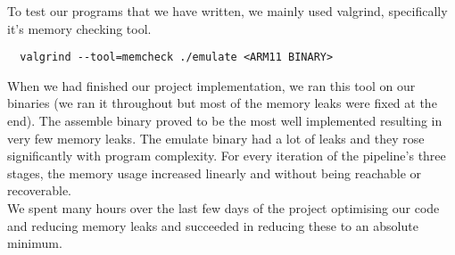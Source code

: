 To test our programs that we have written, we mainly used valgrind, specifically it's memory checking tool.

\begin{verbatim}
  valgrind --tool=memcheck ./emulate <ARM11 BINARY>
\end{verbatim}

When we had finished our project implementation, we ran this tool on our binaries (we ran it throughout but most of the memory leaks were fixed at the end). The assemble binary proved to be the most well implemented resulting in very few memory leaks. The emulate binary had a lot of leaks and they rose significantly with program complexity. For every iteration of the pipeline's three stages, the memory usage increased linearly and without being reachable or recoverable.
~\\

We spent many hours over the last few days of the project optimising our code and reducing memory leaks and succeeded in reducing these to an absolute minimum.